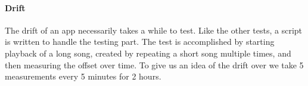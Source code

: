 \paragraph{Drift}
The drift of an app necessarily takes a while to test. Like the other
tests, a script is written to handle the testing part. The test is
accomplished by starting playback of a long song, created by repeating
a short song multiple times, and then measuring the offset over time. To
give us an idea of the drift over we take 5 measurements every 5 minutes
for 2 hours.
